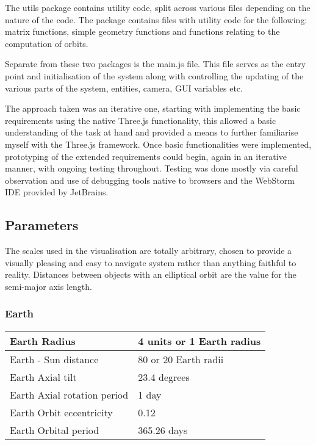 \documentclass[titlepage]{article}
\begin{document}
The utils package contains utility code, split across various files depending on the nature of the code. The package contains files with utility code for the following: matrix functions, simple geometry functions and functions relating to the computation of orbits.


Separate from these two packages is the main.js file. This file serves as the entry point and initialisation of the system along with controlling the updating of the various parts of the system, entities, camera, GUI variables etc. 


The approach taken was an iterative one, starting with implementing the basic requirements using the native Three.js functionality, this allowed a basic understanding of the task at hand and provided a means to further familiarise myself with the Three.js framework. Once basic functionalities were implemented, prototyping of the extended requirements could begin, again in an iterative manner, with ongoing testing throughout. Testing was done mostly via careful observation and use of debugging tools native to browsers and the WebStorm IDE provided by JetBrains.

\subsection{Parameters}
The scales used in the visualisation are totally arbitrary, chosen to provide a visually pleasing and easy to navigate system rather than anything faithful to reality. Distances between objects with an elliptical orbit are the value for the semi-major axis length.
\subsubsection{Earth}
 \begin{tabularx}{0.75\columnwidth}{| X | X |}
            \hline
            Earth Radius & 4 units or 1 Earth radius \\
            \hline
            Earth - Sun distance  & 80 or 20 Earth radii \\
            \hline
            Earth Axial tilt & 23.4 degrees \\
            \hline
            Earth Axial rotation period & 1 day \\
            \hline
			Earth Orbit eccentricity & 0.12 \\
			\hline
			Earth Orbital period & 365.26 days \\
			\hline
        \end{tabularx} \\
\end{document}

